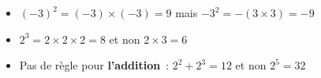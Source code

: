 \documentclass[14pt]{extarticle}
\begin{document}
\begin{tcolorbox}[colback=white, colframe=RedMet, fonttitle=\bfseries, title=Attention aux pièges~!, fontupper=\large, top=0pt, bottom=2pt]
  \begin{itemize}\setlength\itemsep{2pt}
    \item $(-3)^2 = (-3) \times (-3) = 9$ \quad mais \quad $-3^2 = -(3 \times 3) = -9$
    \item $2^3 = 2 \times 2 \times 2 = 8$ \quad et non \quad $2 \times 3 = 6$
    \item Pas de règle pour \textbf{l'addition}~: $2^2 + 2^3 = 12$ \quad et non \quad $2^5 = 32$
  \end{itemize}
\end{tcolorbox}
\end{document}
